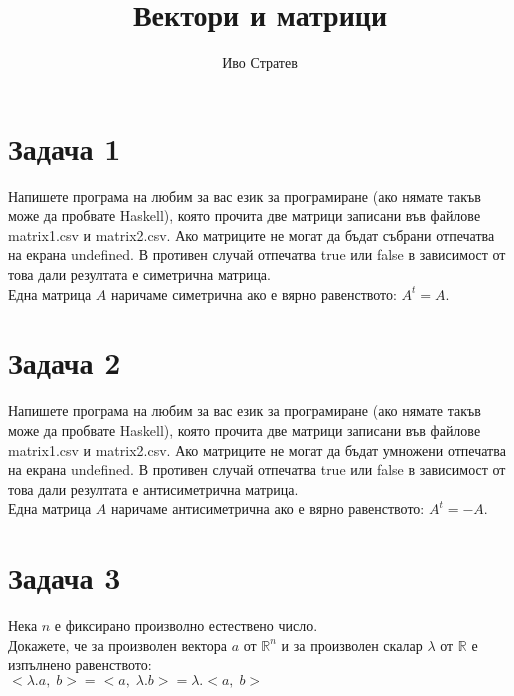 \documentclass[12pt]{article}
\title{Вектори и матрици}
\author{Иво Стратев}
\newcommand{\R}{\mathbb{R}}
\begin{document}
\maketitle

\section*{Задача 1}

Напишете програма на любим за вас език за програмиране (ако нямате такъв може да пробвате Haskell),
която прочита две матрици записани във файлове matrix1.csv и matrix2.csv. Ако матриците не могат да бъдат събрани
отпечатва на екрана undefined. В противен случай отпечатва true или false в зависимост от това дали
резултата е симетрична матрица. \\

Една матрица $A$ наричаме симетрична ако е вярно равенството: $A^t = A$.

\section*{Задача 2}

Напишете програма на любим за вас език за програмиране (ако нямате такъв може да пробвате Haskell),
която прочита две матрици записани във файлове matrix1.csv и matrix2.csv. Ако матриците не могат да бъдат умножени
отпечатва на екрана undefined. В противен случай отпечатва true или false в зависимост от това дали
резултата е антисиметрична матрица. \\

Една матрица $A$ наричаме антисиметрична ако е вярно равенството: $A^t = -A$.

\section*{Задача 3}

Нека $n$ е фиксирано произволно естествено число. \\

Докажете, че за произволен вектора $a$ от $\R^n$ и за произволен скалар $\lambda$ от $\R$ е изпълнено равенството: \\

$<\lambda.a, \; b> = <a, \; \lambda.b> = \lambda.<a, \; b>$
\end{document}
